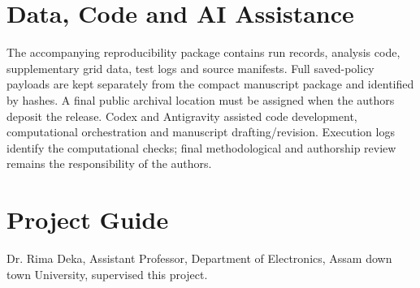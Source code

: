 \documentclass[journal,10pt,twocolumn]{IEEEtran}
\begin{document}
\section*{Data, Code and AI Assistance}
The accompanying reproducibility package contains run records, analysis code, supplementary grid data, test logs and source manifests. Full saved-policy payloads are kept separately from the compact manuscript package and identified by hashes. A final public archival location must be assigned when the authors deposit the release. Codex and Antigravity assisted code development, computational orchestration and manuscript drafting/revision. Execution logs identify the computational checks; final methodological and authorship review remains the responsibility of the authors.
\section*{Project Guide}
Dr. Rima Deka, Assistant Professor, Department of Electronics, Assam down town University, supervised this project.
\end{document}
